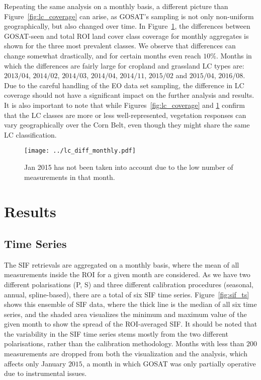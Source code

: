 \documentclass[preprint, a4paper, 10pt, times]{elsarticle}
\begin{document}
Repeating the same analysis on a monthly basis, a different picture than Figure~\ref{fig:lc_coverage} can arise, as GOSAT's sampling is not only non-uniform geographically, but also changed over time. In Figure~\ref{fig:lc_diff_monthly}, the differences between GOSAT-seen and total ROI land cover class coverage for monthly aggregates is shown for the three most prevalent classes. We observe that differences can change somewhat drastically, and for certain months even reach $10\%$. Months in which the differences are fairly large for cropland and grassland LC types are: $2013/04$, $2014/02$, $2014/03$, $2014/04$, $2014/11$, $2015/02$ and $2015/04$, $2016/08$. Due to the careful handling of the EO data set sampling, the difference in LC coverage should not have a significant impact on the further analysis and results. It is also important to note that while Figures~\ref{fig:lc_coverage} and \ref{fig:lc_diff_monthly} confirm that the LC classes are more or less well-represented, vegetation responses can vary geographically over the Corn Belt, even though they might share the same LC classification.

 
\begin{figure}[htbp]
\centering
\texttt{[image: ../lc\_diff\_monthly.pdf]}
\caption{Jan 2015 has not been taken into account due to the low number of measurements in that month.}
\label{fig:lc_diff_monthly}
\end{figure}

 
\section{Results}

\subsection{Time Series}
\label{sec:SIF_TS}

The SIF retrievals are aggregated on a monthly basis, where the mean of all measurements inside the ROI for a given month are considered. As we have two different polarisations (P, S) and three different calibration procedures (seasonal, annual, spline-based), there are a total of six SIF time series. Figure~\ref{fig:sif_ts} shows this ensemble of SIF data, where the thick line is the median of all six time series, and the shaded area visualizes the minimum and maximum value of the given month to show the spread of the ROI-averaged SIF. It should be noted that the variability in the SIF time series stems mostly from the two different polarisations, rather than the calibration methodology. Months with less than $200$ measurements are dropped from both the visualization and the analysis, which affects only January $2015$, a month in which GOSAT was only partially operative due to instrumental issues.
\end{document}
